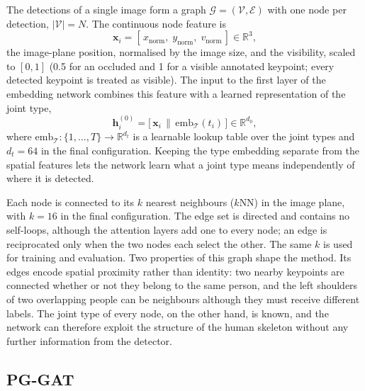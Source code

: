 The detections of a single image form a graph $\mathcal{G} = (\mathcal{V}, \mathcal{E})$ with one node per detection,
$|\mathcal{V}| = N$.
The continuous node feature is
\begin{equation}
    \mathbf{x}_i
    =
    [\,x_{\text{norm}},\;
      y_{\text{norm}},\;
      v_{\text{norm}}\,]
    \in \mathbb{R}^{3},
    \label{eq:node_feature_no_depth}
\end{equation}
the image-plane position, normalised by the image size, and the visibility, scaled to $[0,1]$
(0.5 for an occluded and 1 for a visible annotated keypoint; every detected keypoint is treated as visible).
The input to the first layer of the embedding network combines this feature with a learned representation of the joint type,
\begin{equation}
    \mathbf{h}_i^{(0)}
    = \bigl[\,\mathbf{x}_i \,\big\|\,
    \mathrm{emb}_{\mathcal{T}}(t_i)\,\bigr]
    \in \mathbb{R}^{d_0},
    \label{eq:layer0_input}
\end{equation}
where $\mathrm{emb}_{\mathcal{T}} : \{1, \dots, T\} \to \mathbb{R}^{d_t}$ is a learnable lookup table over the joint types
and $d_t = 64$ in the final configuration.
Keeping the type embedding separate from the spatial features lets the network learn what a joint type means
independently of where it is detected.

Each node is connected to its $k$ nearest neighbours ($k$NN) in the image plane, with $k=16$ in the final configuration.
The edge set is directed and contains no self-loops, although the attention layers add one to every node;
an edge is reciprocated only when the two nodes each select the other.
The same $k$ is used for training and evaluation.
Two properties of this graph shape the method.
Its edges encode spatial proximity rather than identity:
two nearby keypoints are connected whether or not they belong to the same person,
and the left shoulders of two overlapping people can be neighbours although they must receive different labels.
The joint type of every node, on the other hand, is known,
and the network can therefore exploit the structure of the human skeleton without any further information from the detector.

\subsection{PG-GAT}
\label{sec:method_pggat}

